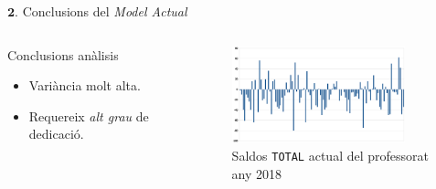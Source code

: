 \documentclass[twocolumn]{beamer}
\begin{document}
\begin{frame}{$\mathbf 2.$ Conclusions del \textit{Model Actual}}
\begin{columns}[t]
	\begin{column}{.5\textwidth}
		\begin{block}{Conclusions anàlisis}
			\begin{itemize}
				\item Variància molt alta.
				\item Requereix \textit{alt grau} de dedicació.
			\end{itemize}
		\end{block}
	\end{column}
	\begin{column}{.5\textwidth}
\begin{figure}
	\includegraphics[width=5cm]{saldo_actual}
	\caption{Saldos \texttt{TOTAL} actual del professorat any 2018}
\end{figure}
	\end{column}
\end{columns}
\end{frame}
\end{document}

